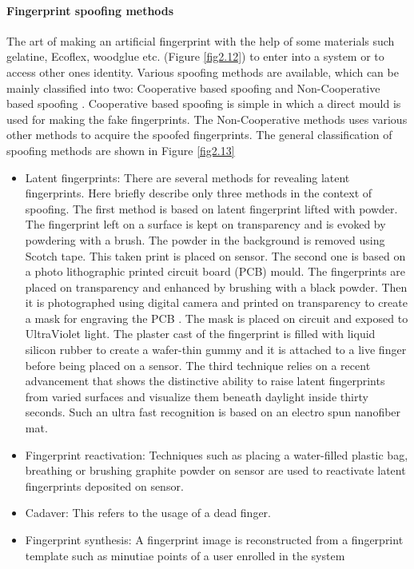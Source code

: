 \paragraph{Fingerprint spoofing methods}
The art of making an artificial fingerprint with the help of some materials such gelatine, Ecoflex, woodglue etc. (Figure \ref{fig2.12}) to enter into a system or to access other ones identity. Various spoofing methods are available, which can be mainly classified into two: Cooperative based spoofing and Non-Cooperative based spoofing \cite{3}. Cooperative based spoofing is simple in which a direct mould is used for making the fake fingerprints. The Non-Cooperative methods uses various other methods to acquire the spoofed fingerprints. The general classification of spoofing methods \cite{17} \cite{3} are shown in Figure \ref{fig2.13}
\begin{itemize}
\item Latent fingerprints: There are several methods for revealing latent fingerprints. Here briefly describe only three methods in the context of spoofing. The first method is based on latent fingerprint lifted with powder. The fingerprint left on a surface is kept on transparency and is evoked by powdering with a brush. The powder in the background is removed using Scotch tape. This taken print is placed on sensor. The second one is based on a photo lithographic printed circuit board (PCB) mould. The fingerprints are placed on transparency and enhanced by brushing with a black powder. Then it is photographed using digital camera and printed on transparency to create a mask for engraving the PCB \cite{3}. The mask is placed on circuit and exposed to UltraViolet light. The plaster cast of the fingerprint is filled with liquid silicon rubber to create a wafer-thin gummy and it is attached to a live finger before being placed on a sensor. The third technique relies on a recent advancement that shows the distinctive ability to raise latent fingerprints from varied surfaces and visualize them beneath daylight inside thirty seconds. Such an ultra fast recognition is based on an electro spun nanofiber mat. 
\item Fingerprint reactivation: Techniques such as placing a water-filled plastic bag, breathing or brushing graphite powder on sensor are used to reactivate latent fingerprints deposited on sensor. \item Cadaver: This refers to the usage of a dead finger. \item Fingerprint synthesis: A fingerprint image is reconstructed from a fingerprint template such as minutiae points of a user enrolled in the system
\end{itemize}

